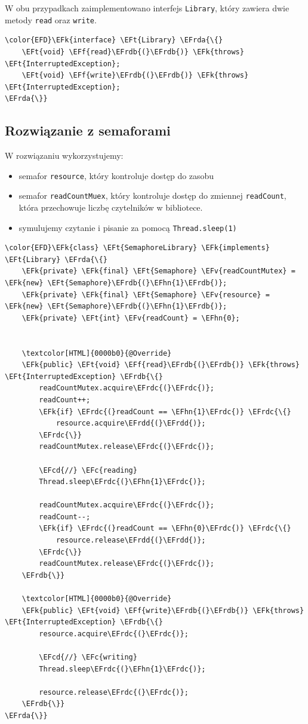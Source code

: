 \documentclass[11pt]{article}
\newcommand{\EFc}[1]{\textcolor{EFc}{\textit{#1}}} %
\newcommand{\EFcd}[1]{\textcolor{EFcd}{\textit{#1}}} %
\newcommand{\EFk}[1]{\textcolor{EFk}{#1}} %
\newcommand{\EFf}[1]{\textcolor{EFf}{#1}} %
\newcommand{\EFv}[1]{\textcolor{EFv}{#1}} %
\newcommand{\EFt}[1]{\textcolor{EFt}{#1}} %
\newcommand{\EFhn}[1]{\textcolor{EFhn}{#1}} %
\newcommand{\EFrda}[1]{#1} %
\newcommand{\EFrdb}[1]{\textcolor{EFrdb}{#1}} %
\newcommand{\EFrdc}[1]{\textcolor{EFrdc}{#1}} %
\newcommand{\EFrdd}[1]{\textcolor{EFrdd}{#1}} %
\begin{document}
W obu przypadkach zaimplementowano interfejs \texttt{Library}, który zawiera dwie metody \texttt{read} oraz \texttt{write}.
\begin{Code}
\begin{Verbatim}
\color{EFD}\EFk{interface} \EFt{Library} \EFrda{\{}
    \EFt{void} \EFf{read}\EFrdb{(}\EFrdb{)} \EFk{throws} \EFt{InterruptedException};
    \EFt{void} \EFf{write}\EFrdb{(}\EFrdb{)} \EFk{throws} \EFt{InterruptedException};
\EFrda{\}}
\end{Verbatim}
\end{Code}
\subsection*{Rozwiązanie z semaforami}
\label{sec:orgb62ba4f}
W rozwiązaniu wykorzystujemy:
\begin{itemize}
\item semafor \texttt{resource}, który kontroluje dostęp do zasobu
\item semafor \texttt{readCountMuex}, który kontroluje dostęp do zmiennej \texttt{readCount}, która przechowuje
liczbę czytelników w bibliotece.
\item symulujemy czytanie i pisanie za pomocą \texttt{Thread.sleep(1)}
\end{itemize}

\begin{Code}
\begin{Verbatim}
\color{EFD}\EFk{class} \EFt{SemaphoreLibrary} \EFk{implements} \EFt{Library} \EFrda{\{}
    \EFk{private} \EFk{final} \EFt{Semaphore} \EFv{readCountMutex} = \EFk{new} \EFt{Semaphore}\EFrdb{(}\EFhn{1}\EFrdb{)};
    \EFk{private} \EFk{final} \EFt{Semaphore} \EFv{resource} = \EFk{new} \EFt{Semaphore}\EFrdb{(}\EFhn{1}\EFrdb{)};
    \EFk{private} \EFt{int} \EFv{readCount} = \EFhn{0};


    \textcolor[HTML]{0000b0}{@Override}
    \EFk{public} \EFt{void} \EFf{read}\EFrdb{(}\EFrdb{)} \EFk{throws} \EFt{InterruptedException} \EFrdb{\{}
        readCountMutex.acquire\EFrdc{(}\EFrdc{)};
        readCount++;
        \EFk{if} \EFrdc{(}readCount == \EFhn{1}\EFrdc{)} \EFrdc{\{}
            resource.acquire\EFrdd{(}\EFrdd{)};
        \EFrdc{\}}
        readCountMutex.release\EFrdc{(}\EFrdc{)};

        \EFcd{//} \EFc{reading}
        Thread.sleep\EFrdc{(}\EFhn{1}\EFrdc{)};

        readCountMutex.acquire\EFrdc{(}\EFrdc{)};
        readCount--;
        \EFk{if} \EFrdc{(}readCount == \EFhn{0}\EFrdc{)} \EFrdc{\{}
            resource.release\EFrdd{(}\EFrdd{)};
        \EFrdc{\}}
        readCountMutex.release\EFrdc{(}\EFrdc{)};
    \EFrdb{\}}

    \textcolor[HTML]{0000b0}{@Override}
    \EFk{public} \EFt{void} \EFf{write}\EFrdb{(}\EFrdb{)} \EFk{throws} \EFt{InterruptedException} \EFrdb{\{}
        resource.acquire\EFrdc{(}\EFrdc{)};

        \EFcd{//} \EFc{writing}
        Thread.sleep\EFrdc{(}\EFhn{1}\EFrdc{)};

        resource.release\EFrdc{(}\EFrdc{)};
    \EFrdb{\}}
\EFrda{\}}
\end{Verbatim}
\end{Code}
\end{document}
